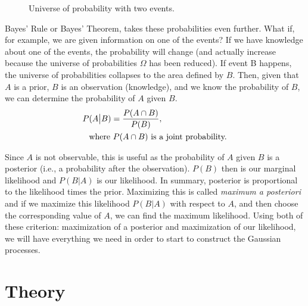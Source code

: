\documentclass[journal]{IEEEtran}
\begin{document}
\begin{figure}[ht]
    \centering
{}
\caption{Universe of probability with two events.}
\label{fig:Bayes}
\end{figure}

Bayes' Rule or Bayes' Theorem, takes these probabilities even further. What if, for example, we are given information on one of the events? If we have knowledge about one of the events, the probability will change (and actually increase because the universe of probabilities \(\Omega\) has been reduced). If event B happens, the universe of probabilities collapses to the area defined by \(B\). Then, given that \(A\) is a prior, \(B\) is an observation (knowledge), and we know the probability of \(B\), we can determine the probability of \(A\) given \(B\).
\begin{align}
    P&(A\big|B) = \frac{P(A\cap B)}{P(B)},\\
    \notag&\text{where }P(A\cap B) \text{ is a joint probability.}
\end{align}

Since \(A\) is not observable, this is useful as the probability of \(A\) given \(B\) is a posterior (i.e., a probability after the observation). \(P(B)\) then is our marginal likelihood and \(P(B|A)\) is our likelihood. In summary, posterior is proportional to the likelihood times the prior. Maximizing this is called \textit{maximum a posteriori} and if we maximize this likelihood \(P(B|A)\) with respect to \(A\), and then choose the corresponding value of \(A\), we can find the maximum likelihood. Using both of these criterion: maximization of a posterior and maximization of our likelihood, we will have everything we need in order to start to construct the Gaussian processes.


\section{Theory}
\end{document}
